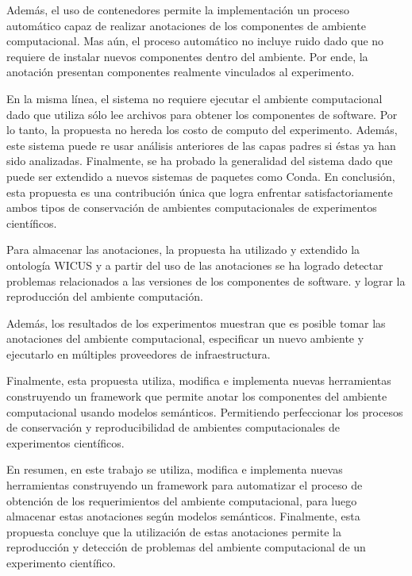 Además, el uso de contenedores permite la implementación un proceso 
automático capaz de realizar anotaciones de los componentes de
ambiente computacional. 
Mas aún, el proceso automático no incluye ruido dado que no requiere de instalar nuevos componentes dentro del ambiente. 
Por ende, la anotación presentan componentes realmente vinculados al experimento.

En la misma línea, el sistema no requiere ejecutar el ambiente 
computacional dado que utiliza sólo lee archivos para obtener 
los componentes de software.
Por lo tanto, la propuesta no hereda los costo de computo del
experimento.
Además, este sistema puede re usar análisis anteriores de las capas padres si éstas ya han sido analizadas. 
Finalmente, se ha probado la generalidad del sistema dado que puede 
ser extendido a nuevos sistemas de paquetes como Conda.
En conclusión, esta propuesta es una contribución única 
que logra enfrentar satisfactoriamente ambos tipos de conservación de ambientes computacionales de experimentos científicos. 


Para almacenar las anotaciones, la propuesta ha utilizado y extendido la ontología WICUS \cite{santana2015towards} y a partir del uso de las anotaciones se ha logrado detectar problemas relacionados a las versiones de los componentes de software. y lograr la reproducción del ambiente computación.

Además, los resultados de los experimentos muestran que es posible tomar las anotaciones del ambiente computacional, especificar un nuevo ambiente y ejecutarlo en múltiples proveedores de infraestructura.

Finalmente, esta propuesta utiliza, modifica e implementa nuevas herramientas construyendo un framework que permite anotar los componentes del ambiente computacional usando modelos semánticos.
Permitiendo perfeccionar los procesos de conservación y reproducibilidad de ambientes computacionales de experimentos científicos.

En resumen, en este trabajo se utiliza, modifica e implementa nuevas herramientas construyendo un framework para automatizar el proceso de obtención de los requerimientos del ambiente computacional, para luego almacenar estas anotaciones según modelos semánticos. Finalmente, esta propuesta concluye que la utilización de estas anotaciones permite la reproducción y detección de problemas del ambiente computacional de un experimento científico.

